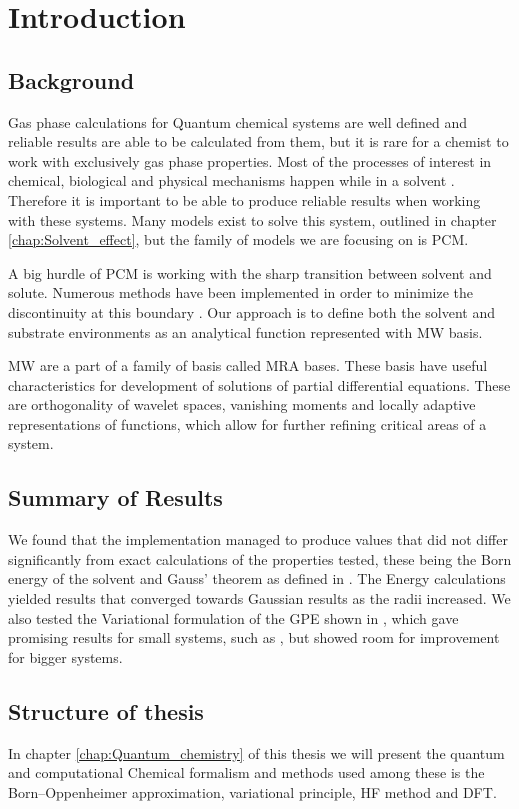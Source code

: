 \documentclass[../master_thesis.tex]{subfiles}
\begin{document}
\chapter{Introduction}
\section{Background}
Gas phase calculations for Quantum chemical systems are well defined and
reliable results are able to be calculated from them, but it is rare for a chemist
to work with exclusively gas phase properties. Most of the processes of interest
in chemical, biological and physical mechanisms happen while in a solvent \cite{FossoTande:2013ka}.
Therefore it is important to be able to produce reliable results when working
with these systems. Many models exist to solve this system, outlined in chapter
\ref{chap:Solvent_effect}, but the family of models we are focusing on is \ac{PCM}.

A big hurdle of \ac{PCM} is working with the sharp transition between solvent and
solute. Numerous methods have been implemented in order to minimize the discontinuity
at this boundary \cite{Tomasi:2005ipa}. Our approach is to define both the solvent
and substrate environments as an analytical function represented with \ac{MW} basis.

\ac{MW} are a part of a family of basis called \ac{MRA} bases. These basis have useful
characteristics for development of solutions of partial differential equations.
These are orthogonality of wavelet spaces, vanishing moments and locally adaptive
representations of functions, which allow for further refining critical areas of a system.


\section{Summary of Results}

We found that the implementation managed to produce values that did not differ
significantly from exact calculations of the properties tested, these being the Born energy of
the solvent \cite{Tomasi:1994wt} and Gauss' theorem as defined in \cite{Sorland}.
The Energy calculations yielded results that converged towards Gaussian results
as the radii increased. We also tested the Variational formulation of the
\ac{GPE} shown in \cite{Lipparini:2010bg}, which gave promising results for
small systems, such as , but showed room for improvement for bigger systems.

\section{Structure of thesis}
In chapter \ref{chap:Quantum_chemistry} of this thesis we will present the quantum
and computational Chemical formalism and methods used among these is the
Born--Oppenheimer approximation, variational principle, \ac{HF} method and
\ac{DFT}.
\end{document}
